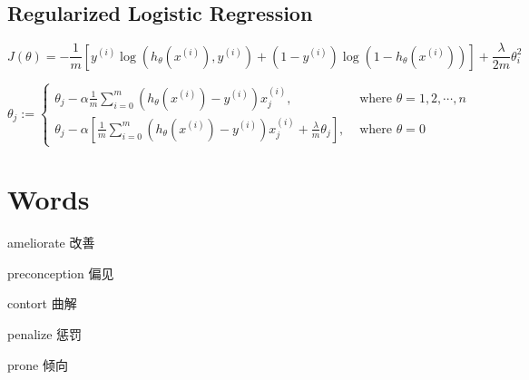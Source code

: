 \documentclass[black,simple]{../elegantbook}
\begin{document}
\subsection{Regularized Logistic Regression}



\[
    J(\theta)=  -\frac{1}{m}\left[y^{(i)} \log (h_\theta(x^{(i)}), y^{(i)}) + (1-y^{(i)}) \log (1-h_\theta(x^{(i)}))\right] + \frac{\lambda}{2 m} \theta_i^2
\]

\[
    \theta_j := \left\{
    \begin{aligned}
        \theta_j - \alpha \frac{1}{m} \sum_{i = 0}^m (h_\theta(x^{(i)}) - y^{(i)})x_j^{(i)}, &\text{ where } \theta = 1, 2, \cdots , n\\
        \theta_j - \alpha \left[\frac{1}{m} \sum_{i = 0}^m (h_\theta(x^{(i)}) - y^{(i)})x_j^{(i)} + \frac{\lambda}{m}\theta_j\right], &\text{ where } \theta = 0
    \end{aligned}    
    \right.
\]


\section*{Words}

ameliorate 改善

preconception 偏见

contort 曲解

penalize 惩罚

prone 倾向





\let\chapname\undefined
\ifx\mainclass\undefined
\end{document}
